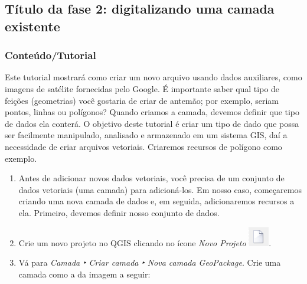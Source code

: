 \documentclass[
]{book}
\providecommand{\tightlist}{%
  \setlength{\itemsep}{0pt}\setlength{\parskip}{0pt}}
\begin{document}
\hypertarget{tuxedtulo-da-fase-2-digitalizando-uma-camada-existente}{%
\subsection{Título da fase 2: digitalizando uma camada existente}\label{tuxedtulo-da-fase-2-digitalizando-uma-camada-existente}}

\hypertarget{conteuxfadotutorial-5}{%
\subsubsection{\texorpdfstring{\textbf{Conteúdo/Tutorial}}{Conteúdo/Tutorial}}\label{conteuxfadotutorial-5}}

Este tutorial mostrará como criar um novo arquivo usando dados auxiliares, como imagens de satélite fornecidas pelo Google. É importante saber qual tipo de feições (geometrias) você gostaria de criar de antemão; por exemplo, seriam pontos, linhas ou polígonos? Quando criamos a camada, devemos definir que tipo de dados ela conterá. O objetivo deste tutorial é criar um tipo de dado que possa ser facilmente manipulado, analisado e armazenado em um sistema GIS, daí a necessidade de criar arquivos vetoriais. Criaremos recursos de polígono como exemplo.

\begin{enumerate}
\def\labelenumi{\arabic{enumi}.}
\tightlist
\item
  Antes de adicionar novos dados vetoriais, você precisa de um conjunto de dados vetoriais (uma camada) para adicioná-los. Em nosso caso, começaremos criando uma nova camada de dados e, em seguida, adicionaremos recursos a ela. Primeiro, devemos definir nosso conjunto de dados.
\item
  Crie um novo projeto no QGIS clicando no ícone \emph{Novo Projeto} \includegraphics{media/modulo7/new-project.png}.
\item
  Vá para \emph{Camada ‣ Criar camada ‣ Nova camada GeoPackage}. Crie uma camada como a da imagem a seguir:
\end{enumerate}
\end{document}
